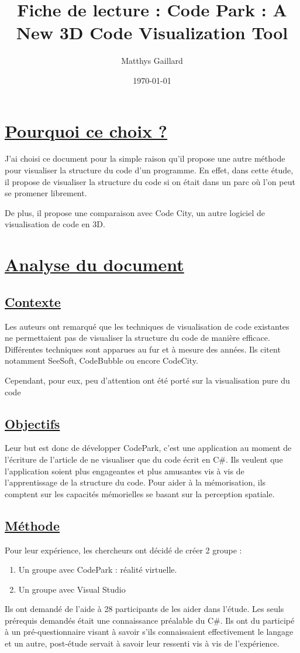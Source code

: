 \documentclass[a4paper,10pt, oneside]{article}
\title{Fiche de lecture : Code Park : A New 3D Code Visualization Tool}
\author{Matthys Gaillard}
\date{\today}
\begin{document}
\maketitle
\section{\ul{Pourquoi ce choix ?}}
    \par J'ai choisi ce document\cite{A0} pour la simple raison qu'il propose une autre méthode pour visualiser la structure du code d'un programme. 
    En effet, dans cette étude, il propose de visualiser la structure du code si on était dans un parc où l'on peut se promener librement.
    \par De plus, il propose une comparaison avec Code City, un autre logiciel de visualisation de code en 3D.
\section{\ul{Analyse du document}}
\subsection{\ul{Contexte}}
    \par Les auteurs ont remarqué que les techniques de visualisation de code existantes ne permettaient pas de visualiser la structure du code de manière efficace.
    Différentes techniques sont apparues au fur et à mesure des années. Ils citent notamment SeeSoft, CodeBubble ou encore CodeCity.
    \par Cependant, pour eux, peu d'attention ont été porté sur la visualisation pure du code
\subsection{\ul{Objectifs}}
    \par Leur but est donc de développer CodePark, c'est une application au moment de l'écriture de l'article de ne visualiser que du code écrit en C\#.
    Ils veulent que l'application soient plus engageantes et plus amusantes vis à vis de l'apprentissage de la structure du code. Pour aider à la mémorisation, ils comptent 
    sur les capacités mémorielles se basant sur la perception spatiale.
\subsection{\ul{Méthode}}
    \par Pour leur expérience, les chercheurs ont décidé de créer 2 groupe :
    \begin{enumerate}
        \item Un groupe avec CodePark : réalité virtuelle.
        \item Un groupe avec Visual Studio
    \end{enumerate}
    \par Ils ont demandé de l'aide à 28 participants de les aider dans l'étude. Les seuls prérequis demandés était une connaissance préalable du C\#. Ils ont du participé à un pré-questionnaire visant 
    à savoir s'ils connaissaient effectivement le langage et un autre, post-étude servait à savoir leur ressenti vis à vis de l'expérience.
\end{document}
